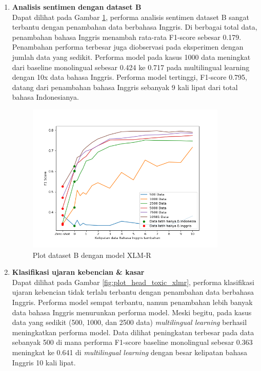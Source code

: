 \begin{enumerate}
            \item \textbf{Analisis sentimen dengan dataset B} \\
            Dapat dilihat pada Gambar \ref{fig:plot_head_prosa_xlmr}, performa analisis sentimen dataset B sangat terbantu dengan penambahan data berbahasa Inggris. Di berbagai total data, penambahan bahasa Inggris menambah rata-rata F1-score sebesar 0.179. Penambahan performa terbesar juga diobservasi pada eksperimen dengan jumlah data yang sedikit. Performa model pada kasus 1000 data meningkat dari baseline monolingual sebesar 0.424 ke 0.717 pada multilingual learning dengan 10x data bahasa Inggris. Performa model tertinggi, F1-score 0.795, datang dari penambahan bahasa Inggris sebanyak 9 kali lipat dari total bahasa Indonesianya.

            \begin{figure}[ht]
                \centering
                \includegraphics[width=0.9\textwidth]{resources/plot-head-prosa-xlmr.png}
                \caption{Plot dataset B dengan model XLM-R}
                \label{fig:plot_head_prosa_xlmr}
            \end{figure}

         
            \item \textbf{Klasifikasi ujaran kebencian \& kasar} \\
            Dapat dilihat pada Gambar \ref{fig:plot_head_toxic_xlmr}, performa klasifikasi ujaran kebencian tidak terlalu terbantu dengan penambahan data berbahasa Inggris. Performa model sempat terbantu, namun penambahan lebih banyak data bahasa Inggris menurunkan performa model. Meski begitu, pada kasus data yang sedikit (500, 1000, dan 2500 data) \textit{multilingual learning} berhasil meningkatkan performa model. Data dilihat peningkatan terbesar pada data sebanyak 500 di mana performa F1-score baseline monolingual sebesar 0.363 meningkat ke 0.641 di \textit{multilingual learning} dengan besar kelipatan bahasa Inggris 10 kali lipat.


\end{enumerate}
